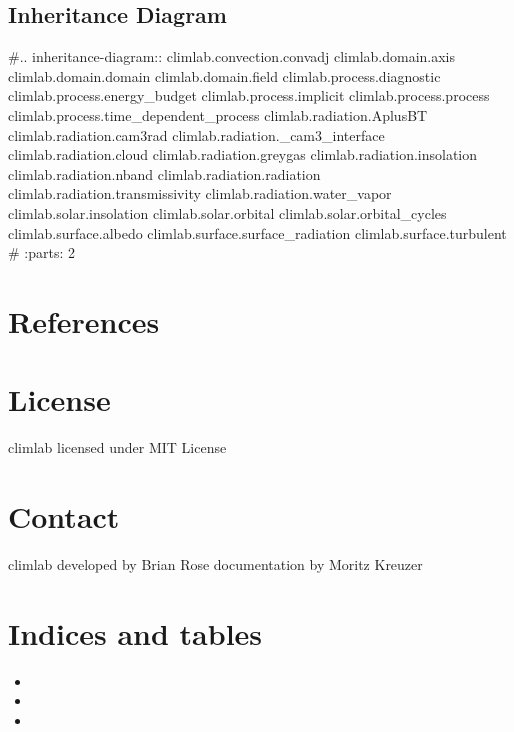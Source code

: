 \documentclass[letterpaper,10pt,english]{sphinxmanual}
\begin{document}
\section{Inheritance Diagram}
\label{api/climlab:inheritance-diagram}
\#.. inheritance-diagram:: climlab.convection.convadj climlab.domain.axis climlab.domain.domain climlab.domain.field climlab.process.diagnostic climlab.process.energy\_budget climlab.process.implicit climlab.process.process climlab.process.time\_dependent\_process climlab.radiation.AplusBT climlab.radiation.cam3rad climlab.radiation.\_cam3\_interface climlab.radiation.cloud climlab.radiation.greygas climlab.radiation.insolation climlab.radiation.nband climlab.radiation.radiation climlab.radiation.transmissivity climlab.radiation.water\_vapor climlab.solar.insolation climlab.solar.orbital climlab.solar.orbital\_cycles climlab.surface.albedo climlab.surface.surface\_radiation climlab.surface.turbulent
\#   :parts: 2


\chapter{References}
\label{references:references}\label{references::doc}

\chapter{License}
\label{license::doc}\label{license:license}
climlab licensed under MIT License


\chapter{Contact}
\label{contact:contact}\label{contact::doc}
climlab developed by Brian Rose
documentation by Moritz Kreuzer


\chapter{Indices and tables}
\label{index:indices-and-tables}\begin{itemize}
\item {} 

\item {} 

\item {} 

\end{itemize}
\end{document}
